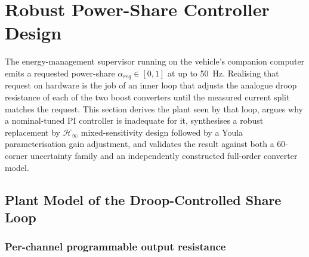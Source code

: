 
\section{Robust Power-Share Controller Design}
\label{sec:robust}

The energy-management supervisor running on the vehicle's companion computer emits a
requested power-share $\alpha_{req}\in[0,1]$ at up to \SI{50}{\hertz}. Realising that
request on hardware is the job of an inner loop that adjusts the analogue droop
resistance of each of the two boost converters until the measured current split matches
the request. This section derives the plant seen by that loop, argues why a
nominal-tuned PI controller is inadequate for it, synthesises a robust replacement by
$\mathcal{H}_\infty$ mixed-sensitivity design followed by a Youla parameterisation gain
adjustment, and validates the result against both a 60-corner uncertainty family and an
independently constructed full-order converter model.

\subsection{Plant Model of the Droop-Controlled Share Loop}
\label{sec:share-plant}


\subsubsection{Per-channel programmable output resistance}

